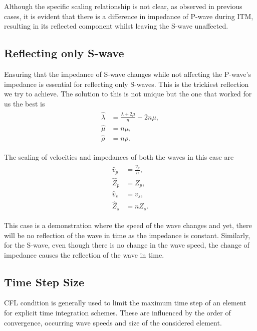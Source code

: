 Although the specific scaling relationship is not clear, as observed in previous cases, it is evident that there is a difference in impedance of P-wave during \ac{ITM},
resulting in its reflected component whilst leaving the S-wave unaffected.

\subsection{Reflecting only S-wave}\label{sec:reflecting_s}
Ensuring that the impedance of S-wave changes while not affecting the P-wave's impedance is essential for reflecting only S-waves. This is the trickiest
reflection we try to achieve. The solution to this is not unique but the one that worked for us the best is
\begin{align}
    \begin{split}
        \hat{\lambda} &= \frac{\lambda + 2 \mu}{n} -  2n \mu ,\\
        \hat{\mu} &= n \mu ,\\
        \hat{\rho} &= n \rho .
    \end{split}
\end{align}

The scaling of velocities and impedances of both the waves in this case are
\begin{align}
    \begin{split}
        \hat{v}_p &= \frac{v_p}{n} ,\\
        \hat{Z}_p &= Z_p ,\\
        \hat{v}_s &= v_s ,\\
        \hat{Z}_s &= n Z_s .
    \end{split}
\end{align}

This case is a demonstration where the speed of the wave changes and yet, there will be no reflection of the wave in time as the impedance is constant.
Similarly, for the S-wave, even though there is no change in the wave speed, the change of impedance causes the reflection of the wave in time.

\subsection{Time Step Size}\label{sec:time_step_size}
\ac{CFL} condition is generally used to limit the maximum time step of an element for explicit time integration schemes. These are influenced by the order
of convergence, occurring wave speeds and size of the considered element.

